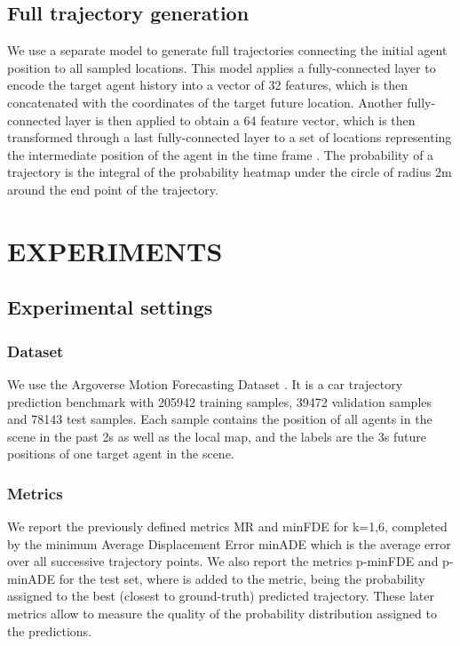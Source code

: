 \documentclass[letterpaper, 10 pt, conference]{ieeeconf}
\begin{document}
\subsection{Full trajectory generation}

We use a separate model to generate full trajectories connecting the initial agent position to all sampled locations. This model applies a fully-connected layer to encode the target agent history into a vector of 32 features, which is then concatenated with the  coordinates of the target future location. Another fully-connected layer is then applied to obtain a 64 feature vector, which is then transformed through a last fully-connected layer to a set of locations representing the intermediate position of the agent in the time frame . The probability of a trajectory is the integral of the probability heatmap under the circle of radius 2m around the end point of the trajectory.




\section{EXPERIMENTS}

\subsection{Experimental settings}

\subsubsection{Dataset} We use the Argoverse Motion Forecasting Dataset \cite{chang2019argoverse}. It is a car trajectory prediction benchmark with 205942 training samples, 39472 validation samples and 78143 test samples. Each sample contains the position of all agents in the scene in the past 2s as well as the local map, and the labels are the 3s future positions of one target agent in the scene. 

\subsubsection{Metrics}

We report the previously defined metrics MR and minFDE for k=1,6, completed by the minimum Average Displacement Error minADE which is the average  error over all successive trajectory points. We also report the metrics p-minFDE and p-minADE for the test set, where  is added to the metric,  being the probability assigned to the best (closest to ground-truth) predicted trajectory. These later metrics allow to measure the quality of the probability distribution assigned to the predictions.
\end{document}
